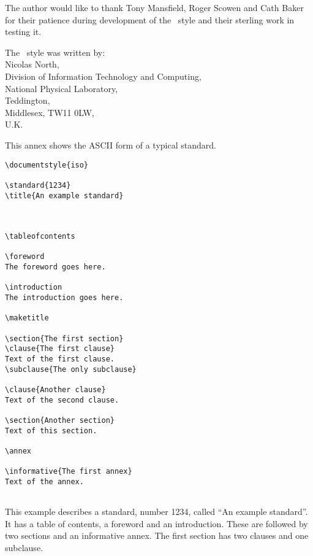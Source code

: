 The author would like to thank Tony Mansfield, Roger Scowen and Cath Baker
for their patience during development of the \iso\ style and their
sterling work in testing it.

The \iso\ style was written by:\\
Nicolas North,\\
Division of Information Technology and Computing,\\
National Physical Laboratory,\\
Teddington,\\
Middlesex, TW11 0LW,\\
U.K.\\

\annex

\label{annex.example}
This annex shows the ASCII form of a typical standard.

\begin{verbatim}
\documentstyle{iso}

\standard{1234}
\title{An example standard}



\tableofcontents

\foreword
The foreword goes here.

\introduction
The introduction goes here.

\maketitle

\section{The first section}
\clause{The first clause}
Text of the first clause.
\subclause{The only subclause}

\clause{Another clause}
Text of the second clause.

\section{Another section}
Text of this section.

\annex

\informative{The first annex}
Text of the annex.


\end{verbatim}

This example describes a standard, number 1234, called ``An example
standard''.
It has a table of contents, a foreword and an introduction.
These are followed by two sections and an informative annex.
The first section  has two clauses and one subclause.

